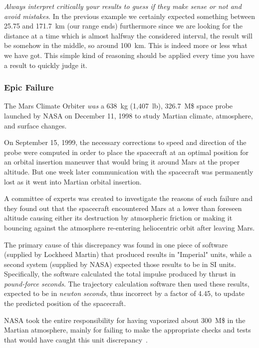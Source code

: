 \emph{Always interpret critically your results to guess if they make sense or not and avoid mistakes}. In the previous example we certainly expected something between 25.75 and 171.7~km (our range ends) furthermore since we are looking for the distance at a time which is almost halfway the considered interval, the result will be somehow in the middle, so around 100~km. This is indeed more or less what we have got. This simple kind of reasoning should be applied every time you have a result to quickly judge it.

\begin{curiosity}
\subsubsection{Epic Failure}
The Mars Climate Orbiter \emph{was} a 638~kg (1,407~lb), 326.7~M\$ space probe launched by NASA on December 11, 1998 to study Martian climate, atmosphere, and surface changes. 

On September 15, 1999, the necessary corrections to speed and direction of the probe were computed in order to place the spacecraft at an optimal position for an orbital insertion maneuver that would bring it around Mars at the proper altitude. 
But one week later communication with the spacecraft was permanently lost as it went into Martian orbital insertion. 

A committee of experts was created to investigate the reasons of 
such failure and they found out that the spacecraft encountered Mars at a lower than foreseen altitude causing either its destruction by atmospheric friction or making it bouncing against the atmosphere re-entering heliocentric orbit after leaving Mars.

The primary cause of this discrepancy was found in one piece of software (supplied by Lockheed Martin) that produced results in "Imperial" units,  while a second system (supplied by NASA) expected those results to be in SI units. Specifically, the software calculated the total impulse produced by thrust in \emph{pound-force seconds}. The trajectory calculation software then used these results, expected to be in \emph{newton seconds}, thus incorrect by a factor of 4.45, to update the predicted position of the spacecraft.
	
NASA took the entire responsibility for having vaporized about 300~M\$ in the Martian atmosphere, mainly for failing to make the appropriate checks and tests that would have caught this unit discrepancy~\cite{bib:mars}.	
\end{curiosity}

